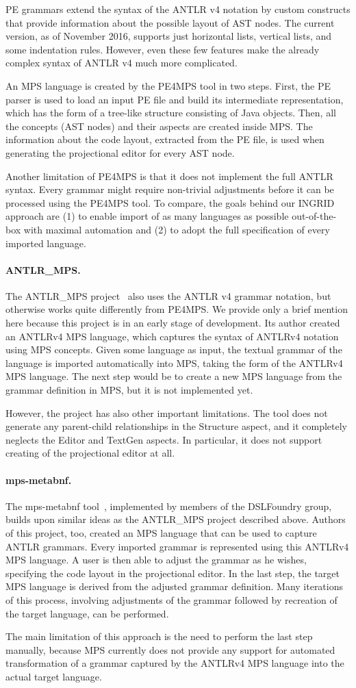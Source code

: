PE grammars extend the syntax of the ANTLR v4 notation by custom constructs that provide information about the possible layout of AST nodes.
The current version, as of November 2016, supports just horizontal lists, vertical lists, and some indentation rules.
However, even these few features make the already complex syntax of ANTLR v4 much more complicated.

An MPS language is created by the PE4MPS tool in two steps.
First, the PE parser is used to load an input PE file and build its intermediate representation, which has the form of a tree-like structure consisting of Java objects.
Then, all the concepts (AST nodes) and their aspects are created inside MPS.
The information about the code layout, extracted from the PE file, is used when generating the projectional editor for every AST node.

Another limitation of PE4MPS is that it does not implement the full ANTLR syntax.
Every grammar might require non-trivial adjustments before it can be processed using the PE4MPS tool.
To compare, the goals behind our INGRID approach are (1) to enable import of as many languages as possible out-of-the-box with maximal automation and (2) to adopt the full specification of every imported language.

\paragraph{ANTLR{\_}MPS.}
The ANTLR{\_}MPS project~\cite{ref:ANTLR2MPS} also uses the ANTLR v4 grammar notation, but otherwise works quite differently from PE4MPS.
We provide only a brief mention here because this project is in an early stage of development.
Its author created an ANTLRv4 MPS language, which captures the syntax of ANTLRv4 notation using MPS concepts.
Given some language as input, the textual grammar of the language is imported automatically into MPS, taking the form of the ANTLRv4 MPS language.
The next step would be to create a new MPS language from the grammar definition in MPS, but it is not implemented yet.

However, the project has also other important limitations.
The tool does not generate any parent-child relationships in the Structure aspect, and it completely neglects the Editor and TextGen aspects.
In particular, it does not support creating of the projectional editor at all.

\paragraph{mps-metabnf.}
The mps-metabnf tool~\cite{ref:MPSMETABNF}, implemented by members of the DSLFoundry group, builds upon similar ideas as the ANTLR{\_}MPS project described above.
Authors of this project, too, created an MPS language that can be used to capture ANTLR grammars.
Every imported grammar is represented using this ANTLRv4 MPS language.
A user is then able to adjust the grammar as he wishes, specifying the code layout in the projectional editor.
In the last step, the target MPS language is derived from the adjusted grammar definition.
Many iterations of this process, involving adjustments of the grammar followed by recreation of the target language, can be performed.

The main limitation of this approach is the need to perform the last step manually, because MPS currently does not provide any support for automated transformation of a grammar captured by the ANTLRv4 MPS language into the actual target language.


